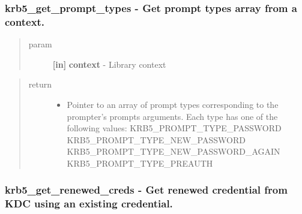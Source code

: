 \documentclass[letterpaper,10pt,english]{sphinxmanual}
\begin{document}
\subsubsection{krb5\_get\_prompt\_types -  Get prompt types array from a context.}
\label{appdev/refs/api/krb5_get_prompt_types::doc}\label{appdev/refs/api/krb5_get_prompt_types:krb5-get-prompt-types-get-prompt-types-array-from-a-context}

\begin{fulllineitems}
\label{appdev/refs/api/krb5_get_prompt_types:c.krb5_get_prompt_types}
\end{fulllineitems}

\begin{quote}\begin{description}
\item[{param}] \leavevmode
\textbf{{[}in{]}} \textbf{context} - Library context

\end{description}\end{quote}
\begin{quote}\begin{description}
\item[{return}] \leavevmode\begin{itemize}
\item {} 
Pointer to an array of prompt types corresponding to the prompter's prompts arguments. Each type has one of the following values: KRB5\_PROMPT\_TYPE\_PASSWORD KRB5\_PROMPT\_TYPE\_NEW\_PASSWORD KRB5\_PROMPT\_TYPE\_NEW\_PASSWORD\_AGAIN KRB5\_PROMPT\_TYPE\_PREAUTH

\end{itemize}

\end{description}\end{quote}


\subsubsection{krb5\_get\_renewed\_creds -  Get renewed credential from KDC using an existing credential.}
\label{appdev/refs/api/krb5_get_renewed_creds:krb5-get-renewed-creds-get-renewed-credential-from-kdc-using-an-existing-credential}\label{appdev/refs/api/krb5_get_renewed_creds::doc}
\end{document}
